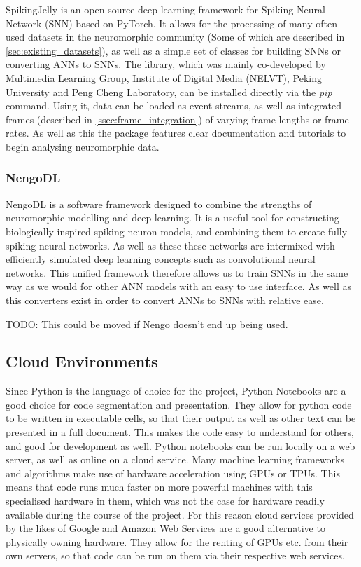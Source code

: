 SpikingJelly\cite{SpikingJelly} is an open-source deep learning framework for Spiking Neural Network (SNN) based on PyTorch. It allows for the processing of many often-used datasets in the neuromorphic community (Some of which are described in \cref{sec:existing_datasets}), as well as a simple set of classes for building SNNs or converting ANNs to SNNs. The library, which was mainly co-developed by Multimedia Learning Group, Institute of Digital Media (NELVT), Peking University and Peng Cheng Laboratory, can be installed directly via the \emph{pip} command. Using it, data can be loaded as event streams, as well as integrated frames (described in \cref{ssec:frame_integration}) of varying frame lengths or frame-rates. As well as this the package features clear documentation and tutorials to begin analysing neuromorphic data.

\subsubsection{NengoDL} \label{sssec:nengo}

NengoDL\cite{NengoDL} is a software framework designed to combine the strengths of neuromorphic modelling and deep learning. It is a useful tool for constructing biologically inspired spiking neuron models, and combining them to create fully spiking neural networks. As well as these these networks are intermixed with efficiently simulated deep learning concepts such as convolutional neural networks. This unified framework therefore allows us to train SNNs in the same way as we would for other ANN models with an easy to use interface. As well as this converters exist in order to convert ANNs to SNNs with relative ease.

\color{red} TODO: This could be moved if Nengo doesn't end up being used. \color{black}

\subsection{Cloud Environments}

Since Python is the language of choice for the project, Python Notebooks are a good choice for code segmentation and presentation. They allow for python code to be written in executable cells, so that their output as well as other text can be presented in a full document. This makes the code easy to understand for others, and good for development as well. Python notebooks can be run locally on a web server, as well as online on a cloud service. Many machine learning frameworks and algorithms make use of hardware acceleration using GPUs or TPUs. This means that code runs much faster on more powerful machines with this specialised hardware in them, which was not the case for hardware readily available during the course of the project. For this reason cloud services provided by the likes of Google and Amazon Web Services are a good alternative to physically owning hardware. They allow for the renting of GPUs etc. from their own servers, so that code can be run on them via their respective web services. 

